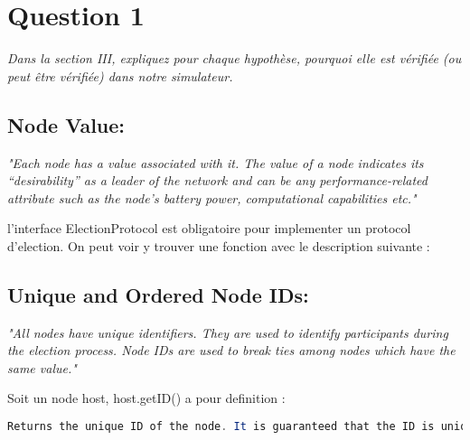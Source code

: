 \documentclass[11pt,a4paper,sans]{report}
\begin{document}
	\begin{comment}
		an undirected graph that changes over time as nodes move. The vertices in the graph correspond to mobile nodes and an edge between a pair of nodes represents the fact that the two nodes are within each other’s transmission radii and, hence, can directly communicate with one another. The graph can become disconnected if the network is partitioned due to node movement
	\end{comment}

	\section{Question 1}
	\textit{Dans la section III, expliquez pour chaque hypothèse, pourquoi elle est vérifiée (ou peut être vérifiée) dans notre simulateur.}

	\subsection{Node Value:}
	\textit{"Each node has a value associated with it. The value of a node indicates its “desirability” as a leader of the network and can be any performance-related attribute such as the node’s battery power, computational capabilities etc."}

	l'interface ElectionProtocol est obligatoire pour implementer un protocol d'election. On peut voir y trouver une fonction avec le description suivante :


	\subsection{Unique and Ordered Node IDs:}
	\textit{"All nodes have unique identifiers. They are used to identify participants during the election process. Node IDs are used to break ties among nodes which have the same value."}

	Soit un node host, host.getID() a pour definition :
	\begin{lstlisting}[language=java]
		Returns the unique ID of the node. It is guaranteed that the ID is unique during the entire simulation, that is, there will be no different Node objects with the same ID in the system during one invocation of the JVM. Preferably nodes should implement hashCode() based on this ID.
	\end{lstlisting}
\end{document}
